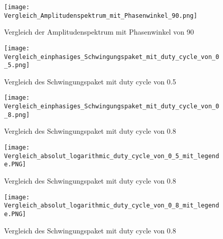 \begin{appendix}
\begin{figure}[ht!]
	\centering
	\texttt{[image: Vergleich\_Amplitudenspektrum\_mit\_Phasenwinkel\_90.png]}	
	\caption{Vergleich der Amplitudenspektrum mit Phasenwinkel von 90\textdegree}
	\label{fig:Vergleich_der_Amplitudenspektrum_mit Phasenwinkel_von_90}
\end{figure}

\begin{figure}[ht!]
	\centering
	\texttt{[image: Vergleich\_einphasiges\_Schwingungspaket\_mit\_duty\_cycle\_von\_0\_5.png]}	
	\caption{Vergleich des Schwingungspaket mit duty cycle von 0.5}
	\label{fig:Vergleich des Schwingungspaket mit duty cycle von 0.5}
\end{figure}

\newpage

\begin{figure}[ht!]
	\centering
	\texttt{[image: Vergleich\_einphasiges\_Schwingungspaket\_mit\_duty\_cycle\_von\_0\_8.png]}	
	\caption{Vergleich des Schwingungspaket mit duty cycle von 0.8}
	\label{fig:Vergleich des Schwingungspaket mit duty cycle von 0.8}
\end{figure}

\begin{figure}[ht!]
	\centering
	\texttt{[image: Vergleich\_absolut\_logarithmic\_duty\_cycle\_von\_0\_5\_mit\_legende.PNG]}	
	\caption{Vergleich des Schwingungspaket mit duty cycle von 0.8}
	\label{fig:Vergleich_absolut_logarithmic_duty_cycle_von_0_5_mit_legende}
\end{figure}

\begin{figure}[ht!]
	\centering
	\texttt{[image: Vergleich\_absolut\_logarithmic\_duty\_cycle\_von\_0\_8\_mit\_legende.PNG]}	
	\caption{Vergleich des Schwingungspaket mit duty cycle von 0.8}
	\label{fig:Vergleich_absolut_logarithmic_duty_cycle_von_0_8_mit_legende}
\end{figure}

\end{appendix}


